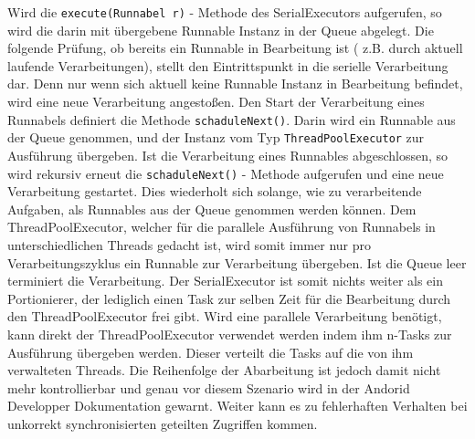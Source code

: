 \documentclass[12pt,oneside,a4paper,bibtotoc,liststotoc]{scrreprt}
\begin{document}
Wird die \texttt{execute(Runnabel r)} - Methode des SerialExecutors aufgerufen, so wird die darin mit übergebene Runnable Instanz in der Queue abgelegt. Die folgende Prüfung, ob bereits ein Runnable in Bearbeitung ist ( z.B. durch aktuell laufende Verarbeitungen), stellt den Eintrittspunkt in die serielle Verarbeitung dar. Denn nur wenn sich aktuell keine Runnable Instanz in Bearbeitung befindet, wird eine neue Verarbeitung angestoßen. Den Start der Verarbeitung eines Runnabels definiert die Methode \texttt{schaduleNext()}. Darin wird ein Runnable aus der Queue genommen, und der Instanz vom Typ \texttt{ThreadPoolExecutor} zur Ausführung übergeben. Ist die Verarbeitung eines Runnables abgeschlossen, so wird rekursiv erneut die \texttt{schaduleNext()} - Methode aufgerufen und eine neue Verarbeitung gestartet. Dies wiederholt sich solange, wie zu verarbeitende Aufgaben, als Runnables aus der Queue genommen werden können.  Dem ThreadPoolExecutor, welcher für die parallele Ausführung von Runnabels in unterschiedlichen Threads gedacht ist, wird somit immer nur pro Verarbeitungszyklus ein Runnable zur Verarbeitung übergeben. Ist die Queue leer terminiert die Verarbeitung. Der SerialExecutor ist somit nichts weiter als ein Portionierer, der lediglich einen Task zur selben Zeit für die Bearbeitung durch den ThreadPoolExecutor frei gibt.\newline
Wird eine parallele Verarbeitung benötigt, kann direkt der ThreadPoolExecutor verwendet werden indem ihm n-Tasks zur Ausführung übergeben werden. Dieser verteilt die Tasks auf die von ihm verwalteten Threads. Die Reihenfolge der Abarbeitung ist jedoch damit nicht mehr kontrollierbar und genau vor diesem Szenario wird in der Andorid Developper Dokumentation gewarnt. Weiter kann es zu fehlerhaften Verhalten bei unkorrekt synchronisierten geteilten Zugriffen kommen.\newline
\end{document}
